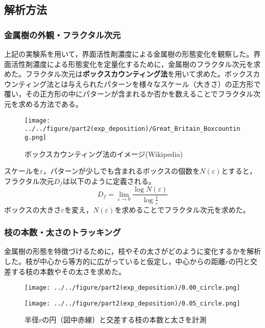 \documentclass[autodetect-engine,dvi=dvipdfmx,a4paper,ja=standard,oneside,openany,11pt,draft]{bxjsbook}
\begin{document}
\subsection{解析方法}
\subsubsection{金属樹の外観・フラクタル次元}
上記の実験系を用いて，界面活性剤濃度による金属樹の形態変化を観察した。界面活性剤濃度による形態変化を定量化するために，金属樹のフラクタル次元を求めた。フラクタル次元は\textbf{ボックスカウンティング法}を用いて求めた。ボックスカウンティング法とは与えられたパターンを様々なスケール（大きさ）の正方形で覆い，その正方形の中にパターンが含まれるか否かを数えることでフラクタル次元を求める方法である。
\begin{figure}[H]
  \centering
  \texttt{[image: ../../figure/part2(exp\_deposition)/Great\_Britain\_Boxcounting.png]}
  \caption{ボックスカウンティング法のイメージ(Wikipedia)}
  \label{fig:box_counting}
\end{figure}
スケールを$\varepsilon$，パターンが少しでも含まれるボックスの個数を$N(\varepsilon)$とすると，フラクタル次元$D_f$は以下のように定義される。
\begin{equation}
  D_f = \lim_{\varepsilon \to 0} \frac{\log N(\varepsilon)}{\log \frac{1}{\varepsilon}}
\end{equation}
ボックスの大きさ$\varepsilon$を変え，$N(\varepsilon)$を求めることでフラクタル次元を求めた。
\subsubsection{枝の本数・太さのトラッキング}
金属樹の形態を特徴づけるために，枝やその太さがどのように変化するかを解析した。枝が中心から等方的に広がっていると仮定し，中心からの距離$r$の円と交差する枝の本数やその太さを求めた。
\begin{figure}[htbp]
  \begin{minipage}
    {0.5\textwidth}
    \centering
    \texttt{[image: ../../figure/part2(exp\_deposition)/0.00\_circle.png]}
    \label{fig:0.00_circle}
  \end{minipage}
  \begin{minipage}
    {0.5\textwidth}
    \centering
    \texttt{[image: ../../figure/part2(exp\_deposition)/0.05\_circle.png]}
    \label{fig:0.05_circle}
  \end{minipage}
  \caption{半径$r$の円（図中赤線）と交差する枝の本数と太さを計測}
\end{figure}
\end{document}
